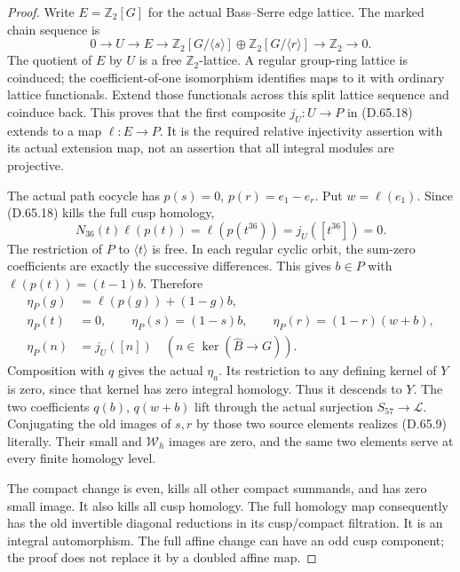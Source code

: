 \begin{proof}
Write \(E=\mathbb Z_2[G]\) for the actual Bass--Serre edge lattice.
The marked chain sequence is
\[
 0\longrightarrow U\longrightarrow E
   \longrightarrow\mathbb Z_2[G/\langle s\rangle]
          \oplus\mathbb Z_2[G/\langle r\rangle]
   \longrightarrow\mathbb Z_2\longrightarrow0.
 \tag{D.65.19}
\]
The quotient of \(E\) by \(U\) is a free \(\mathbb Z_2\)-lattice.
A regular group-ring lattice is coinduced; the coefficient-of-one
isomorphism identifies maps to it with ordinary lattice
functionals. Extend those functionals across this split lattice
sequence and coinduce back. This proves that the first composite
\(j_U:U\to P\) in (D.65.18) extends to a map \(\ell:E\to P\).
It is the required relative injectivity assertion with its actual
extension map, not an assertion that all integral modules are
projective.

The actual path cocycle has
\(p(s)=0\), \(p(r)=e_1-e_r\). Put \(w=\ell(e_1)\).
Since (D.65.18) kills the full cusp homology,
\[
       N_{36}(t)\ell(p(t))
          =\ell(p(t^{36}))=j_U([t^{36}])=0.
 \tag{D.65.20}
\]
The restriction of \(P\) to \(\langle t\rangle\) is free. In each
regular cyclic orbit, the sum-zero coefficients are exactly the
successive differences. This gives \(b\in P\) with
\(\ell(p(t))=(t-1)b\). Therefore
\[
 \begin{aligned}
 \eta_P(g)&=\ell(p(g))+(1-g)b,\\
 \eta_P(t)&=0,\qquad
 \eta_P(s)=(1-s)b,\qquad
 \eta_P(r)=(1-r)(w+b),\\
 \eta_P(n)&=j_U([n])\quad(n\in\ker(\widehat B\to G)).
 \end{aligned}
 \tag{D.65.21}
\]
Composition with \(q\) gives the actual \(\eta_a\).
Its restriction to any defining kernel of \(Y\) is zero, since
that kernel has zero integral homology. Thus it descends to \(Y\).
The two coefficients \(q(b)\), \(q(w+b)\) lift through the actual
surjection \(S_{57}\to\mathcal L\). Conjugating the old images of
\(s,r\) by those two source elements realizes (D.65.9) literally.
Their small and \(\mathcal W_h\) images are zero, and the same two
elements serve at every finite homology level.

The compact change is even, kills all other compact summands, and
has zero small image. It also kills all cusp homology. The full
homology map consequently has the old invertible diagonal
reductions in its cusp/compact filtration. It is an integral
automorphism. The full affine change can have an odd cusp component;
the proof does not replace it by a doubled affine map.


\end{proof}
